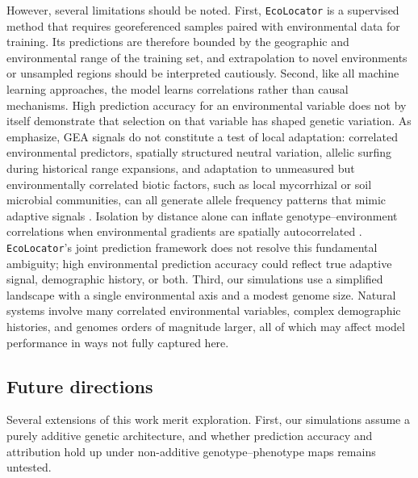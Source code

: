 \documentclass[]{article}
\newcommand{\ecolocator}{\texttt{EcoLocator}\xspace}
\begin{document}
However, several limitations should be noted.
First, \ecolocator is a supervised method
that requires georeferenced samples paired
with environmental data for training.
Its predictions are therefore bounded
by the geographic and environmental range of the training set,
and extrapolation to novel environments
or unsampled regions should be interpreted cautiously.
Second, like all machine learning approaches,
the model learns correlations rather than causal mechanisms.
High prediction accuracy for an environmental variable
does not by itself demonstrate that selection
on that variable has shaped genetic variation.
As \citet{booker_wza_2024} emphasize,
GEA signals do not constitute a test of local adaptation:
correlated environmental predictors,
spatially structured neutral variation,
allelic surfing during historical range expansions,
and adaptation to unmeasured but environmentally correlated biotic
factors, such as local mycorrhizal or soil microbial communities,
can all generate allele frequency patterns
that mimic adaptive signals
\citep{klopfstein_surfing_2006, novembre_spatial_2009}.
Isolation by distance alone can inflate
genotype--environment correlations
when environmental gradients are spatially autocorrelated
\citep{meirmans_ibd_2012}.
\ecolocator's joint prediction framework
does not resolve this fundamental ambiguity;
high environmental prediction accuracy
could reflect true adaptive signal, demographic history,
or both.
Third, our simulations use a simplified landscape
with a single environmental axis
and a modest genome size.
Natural systems involve many correlated environmental variables,
complex demographic histories,
and genomes orders of magnitude larger,
all of which may affect model performance in ways
not fully captured here.

\subsection{Future directions}

Several extensions of this work merit exploration.
First, our simulations assume a purely additive genetic architecture,
and whether prediction accuracy and attribution hold up under
non-additive genotype--phenotype maps remains untested.
\end{document}
